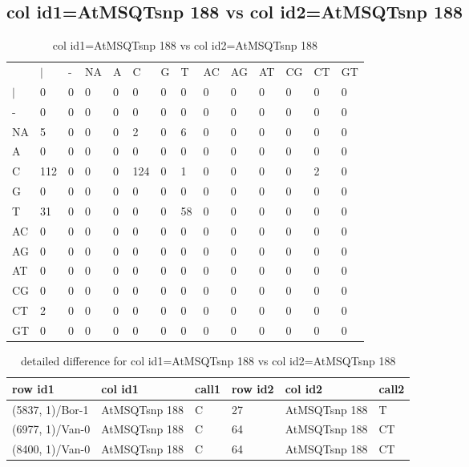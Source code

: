\subsection{col id1=AtMSQTsnp 188 vs col id2=AtMSQTsnp 188}
\begin{center}
\begin{longtable}{|l|l|l|l|l|l|l|l|l|l|l|l|l|l|}
\caption{col id1=AtMSQTsnp 188 vs col id2=AtMSQTsnp 188} \label{table_dm760}\\
\hline
\\
\hline
&$|$&-&NA&A&C&G&T&AC&AG&AT&CG&CT&GT\\
$|$&0&0&0&0&0&0&0&0&0&0&0&0&0\\
-&0&0&0&0&0&0&0&0&0&0&0&0&0\\
NA&5&0&0&0&2&0&6&0&0&0&0&0&0\\
A&0&0&0&0&0&0&0&0&0&0&0&0&0\\
C&112&0&0&0&124&0&1&0&0&0&0&2&0\\
G&0&0&0&0&0&0&0&0&0&0&0&0&0\\
T&31&0&0&0&0&0&58&0&0&0&0&0&0\\
AC&0&0&0&0&0&0&0&0&0&0&0&0&0\\
AG&0&0&0&0&0&0&0&0&0&0&0&0&0\\
AT&0&0&0&0&0&0&0&0&0&0&0&0&0\\
CG&0&0&0&0&0&0&0&0&0&0&0&0&0\\
CT&2&0&0&0&0&0&0&0&0&0&0&0&0\\
GT&0&0&0&0&0&0&0&0&0&0&0&0&0\\
\hline
\end{longtable}
\end{center}

\begin{center}
\begin{longtable}{|l|l|l|l|l|l|}
\caption{detailed difference for col id1=AtMSQTsnp 188 vs col id2=AtMSQTsnp 188} \label{table_dm761}\\
\hline
row id1&col id1&call1&row id2&col id2&call2\\
\hline
(5837, 1)/Bor-1&AtMSQTsnp 188&C&27&AtMSQTsnp 188&T\\
(6977, 1)/Van-0&AtMSQTsnp 188&C&64&AtMSQTsnp 188&CT\\
(8400, 1)/Van-0&AtMSQTsnp 188&C&64&AtMSQTsnp 188&CT\\
\hline
\end{longtable}
\end{center}

